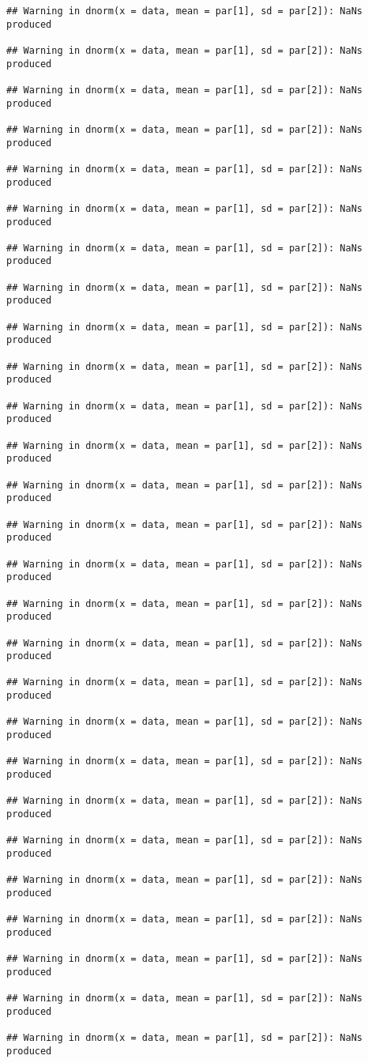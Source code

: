 \documentclass[
]{article}
\begin{document}
\begin{verbatim}
## Warning in dnorm(x = data, mean = par[1], sd = par[2]): NaNs produced

## Warning in dnorm(x = data, mean = par[1], sd = par[2]): NaNs produced

## Warning in dnorm(x = data, mean = par[1], sd = par[2]): NaNs produced

## Warning in dnorm(x = data, mean = par[1], sd = par[2]): NaNs produced

## Warning in dnorm(x = data, mean = par[1], sd = par[2]): NaNs produced

## Warning in dnorm(x = data, mean = par[1], sd = par[2]): NaNs produced

## Warning in dnorm(x = data, mean = par[1], sd = par[2]): NaNs produced

## Warning in dnorm(x = data, mean = par[1], sd = par[2]): NaNs produced

## Warning in dnorm(x = data, mean = par[1], sd = par[2]): NaNs produced

## Warning in dnorm(x = data, mean = par[1], sd = par[2]): NaNs produced

## Warning in dnorm(x = data, mean = par[1], sd = par[2]): NaNs produced

## Warning in dnorm(x = data, mean = par[1], sd = par[2]): NaNs produced

## Warning in dnorm(x = data, mean = par[1], sd = par[2]): NaNs produced

## Warning in dnorm(x = data, mean = par[1], sd = par[2]): NaNs produced

## Warning in dnorm(x = data, mean = par[1], sd = par[2]): NaNs produced

## Warning in dnorm(x = data, mean = par[1], sd = par[2]): NaNs produced

## Warning in dnorm(x = data, mean = par[1], sd = par[2]): NaNs produced

## Warning in dnorm(x = data, mean = par[1], sd = par[2]): NaNs produced

## Warning in dnorm(x = data, mean = par[1], sd = par[2]): NaNs produced

## Warning in dnorm(x = data, mean = par[1], sd = par[2]): NaNs produced

## Warning in dnorm(x = data, mean = par[1], sd = par[2]): NaNs produced

## Warning in dnorm(x = data, mean = par[1], sd = par[2]): NaNs produced

## Warning in dnorm(x = data, mean = par[1], sd = par[2]): NaNs produced

## Warning in dnorm(x = data, mean = par[1], sd = par[2]): NaNs produced

## Warning in dnorm(x = data, mean = par[1], sd = par[2]): NaNs produced

## Warning in dnorm(x = data, mean = par[1], sd = par[2]): NaNs produced

## Warning in dnorm(x = data, mean = par[1], sd = par[2]): NaNs produced
\end{verbatim}
\end{document}
